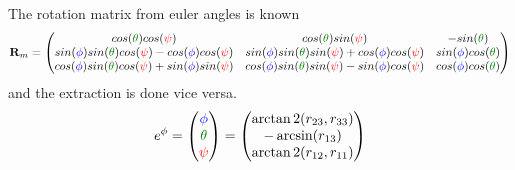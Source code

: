 The rotation matrix from euler angles is known
\begin{equation}
\mat R_m = \begin{pmatrix}
cos(\Pitch)cos(\Yaw)									& cos(\Pitch)sin(\Yaw)									& -sin(\Pitch)			\\
sin(\Roll)sin(\Pitch)cos(\Yaw) - cos(\Roll)cos(\Yaw)	& sin(\Roll)sin(\Pitch)sin(\Yaw) + cos(\Roll)cos(\Yaw)	& sin(\Roll)cos(\Pitch)	\\
cos(\Roll)sin(\Pitch)cos(\Yaw) + sin(\Roll)sin(\Yaw)	& cos(\Roll)sin(\Pitch)sin(\Yaw) - sin(\Roll)cos(\Yaw)	& cos(\Roll)cos(\Pitch)
\end{pmatrix}
\end{equation}
and the extraction is done vice versa.
\begin{equation}
\eu e = \begin{pmatrix}\Roll \\ \Pitch \\ \Yaw \end{pmatrix} = 
\begin{pmatrix}
\arctan2(r_{23}, r_{33}) \\
-\arcsin(r_{13}) \\
\arctan2(r_{12}, r_{11})
\end{pmatrix}
\end{equation}
